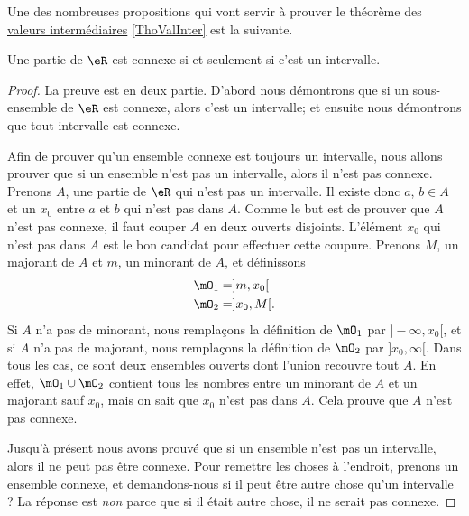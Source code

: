 Une des nombreuses propositions qui vont servir à prouver le théorème des \href{http://fr.wikipedia.org/wiki/Théorème_des_valeurs_intermédiaires}{valeurs intermédiaires} \ref{ThoValInter} est la suivante.
\begin{proposition} \label{PropInterssiConn}
    Une partie de $\eR$ est connexe si et seulement si c'est un intervalle.
\end{proposition}

\begin{proof}
    La preuve est en deux partie. D'abord nous démontrons que si un sous-ensemble de $\eR$ est connexe, alors c'est un intervalle; et ensuite nous démontrons que tout intervalle est connexe.

    Afin de prouver qu'un ensemble connexe est toujours un intervalle, nous allons prouver que si un ensemble n'est pas un intervalle, alors il n'est pas connexe. Prenons $A$, une partie de $\eR$ qui n'est pas un intervalle. Il existe donc $a$, $b\in A$ et un $x_0$ entre $a$ et $b$ qui n'est pas dans $A$. Comme le but est de prouver que $A$ n'est pas connexe, il faut couper $A$ en deux ouverts disjoints. L'élément $x_0$ qui n'est pas dans $A$ est le bon candidat pour effectuer cette coupure. Prenons $M$, un majorant de $A$ et $m$, un minorant de $A$, et définissons 
    \begin{align*}
        \mO_1&=]m,x_0[\\
        \mO_2&=]x_0,M[.
    \end{align*}
    Si $A$ n'a pas de minorant, nous remplaçons la définition de $\mO_1$ par $]-\infty,x_0[$, et si $A$ n'a pas de majorant, nous remplaçons la définition de $\mO_2$ par $]x_0,\infty[$. Dans tous les cas, ce sont deux ensembles ouverts dont l'union recouvre tout $A$. En effet, $\mO_1\cup \mO_2$ contient tous les nombres entre un minorant de $A$ et un majorant sauf $x_0$, mais on sait que $x_0$ n'est pas dans $A$. Cela prouve que $A$ n'est pas connexe.

    Jusqu'à présent nous avons prouvé que si un ensemble n'est pas un intervalle, alors il ne peut pas être connexe. Pour remettre les choses à l'endroit, prenons un ensemble connexe, et demandons-nous si il peut être autre chose qu'un intervalle ? La réponse est \emph{non} parce que si il était autre chose, il ne serait pas connexe.


\end{proof}

